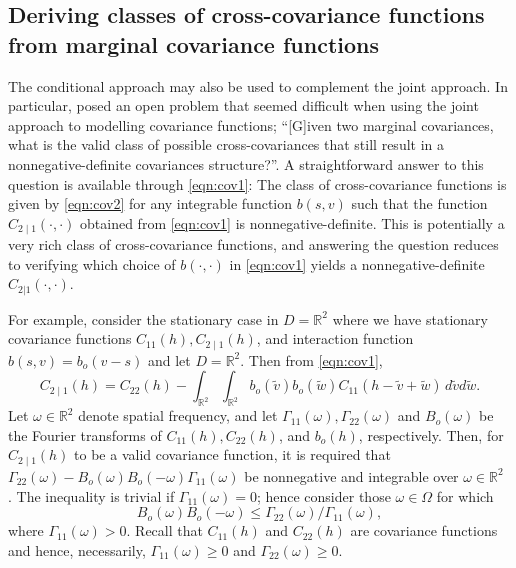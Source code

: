 \documentclass[lineno]{biometrika}
\newcommand{\svec} {s}
\newcommand{\omegab} {\omega}
\newcommand{\s}{s}
\newcommand{\h}{h}
\renewcommand{\v}{v}
\newcommand{\w}{w}
\renewcommand{\d}{d}
\newcommand{\RR}{\mathbb{R}}
\begin{document}
\subsection{Deriving classes of cross-covariance functions from marginal covariance functions}\label{sec:cross-cov}

The conditional approach may also be used to complement the joint approach. In particular, \citet{GentonKleiber2015} posed an open problem that seemed difficult when using the joint approach to modelling covariance functions; ``[G]iven two marginal covariances, what is the valid class of possible cross-covariances that still result in a nonnegative-definite covariances structure?''. A straightforward answer to this question is available through \eqref{eqn:cov1}: The class of cross-covariance functions is given by \eqref{eqn:cov2} for any integrable function $b(\svec,\v)$ such that the function $C_{2\mid 1}(\cdot,\cdot)$ obtained from \eqref{eqn:cov1} is nonnegative-definite. This is potentially a very rich class of cross-covariance functions, and answering the question reduces to verifying which choice of $b(\cdot,\cdot)$ in \eqref{eqn:cov1} yields a nonnegative-definite $C_{2|1}(\cdot,\cdot)$.

For example, consider the stationary case in $D = \mathbb{R}^2$ where we have stationary covariance functions $C_{11}(\h), C_{2\mid 1}(\h)$, and interaction function $b(\s,\v) = b_o(\v - \svec)$ and let $D = \RR^2$. Then from \eqref{eqn:cov1},
\begin{equation*}
C_{2\mid 1}(\h) = C_{22}(\h) - \int_{\mathbb{R}^2}\int_{\mathbb{R}^2}{b_o(\tilde\v)b_o(\tilde\w)C_{11}(\h - \tilde\v + \tilde\w)\,\d\tilde\v\d\tilde\w}.
\end{equation*}
\noindent Let $\omegab \in \mathbb{R}^2$ denote spatial frequency, and let $\Gamma_{11}(\omegab), \Gamma_{22}(\omegab)$ and $B_o(\omegab)$ be the Fourier transforms of $C_{11}(\h), C_{22}(\h)$, and $b_o(\h)$, respectively. Then, for $C_{2\mid 1}(\h)$ to be a valid covariance function, it is required that $\Gamma_{22}(\omegab) - B_o(\omegab)B_o(-\omegab)\Gamma_{11}(\omegab)$ be nonnegative and integrable over $\omegab \in \mathbb{R}^2$ \citep{Cressie_1999,Gneiting_2002}. The inequality is trivial if $\Gamma_{11}(\omegab) = 0$; hence consider those $\omegab \in \Omega$ for which 
\begin{equation}\label{eq:B_ineq}
B_o(\omegab)B_o(-\omegab) \le \Gamma_{22}(\omegab)/\Gamma_{11}(\omegab),
\end{equation}
where $\Gamma_{11}(\omegab) > 0$. Recall that $C_{11}(\h)$ and $C_{22}(\h)$ are covariance functions and hence, necessarily, $\Gamma_{11}(\omegab) \ge 0$ and $\Gamma_{22}(\omegab) \ge 0$.
\end{document}
